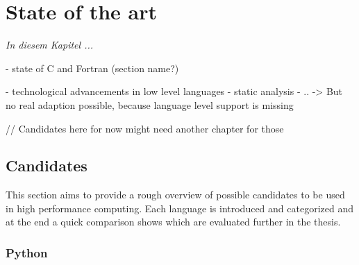 \chapter{State of the art}
\label{chap:State_of_the_art}

\textit{%
In diesem Kapitel ...
}
\bigskip

- state of C and Fortran (section name?)

- technological advancements in low level languages
    - static analysis
    - ..
    -> But no real adaption possible, because language level support is missing



// Candidates here for now might need another chapter for those

\section{Candidates}
\label{sec:Candidates}

This section aims to provide a rough overview of possible candidates to be used in high performance computing. Each language is introduced and categorized and at the end a quick comparison shows which are evaluated further in the thesis.

\subsection*{Python}
\label{ssec:Candidates.Python}

